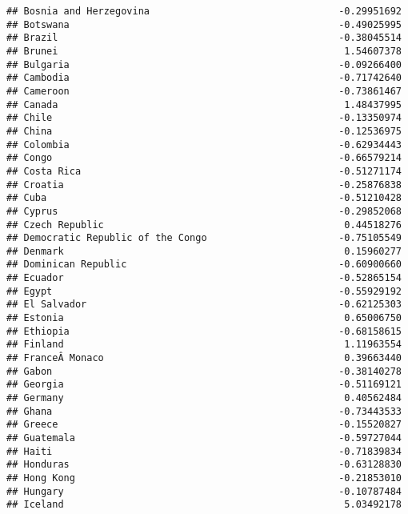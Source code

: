 \documentclass[
]{article}
\begin{document}
\begin{verbatim}
## Bosnia and Herzegovina                                 -0.29951692
## Botswana                                               -0.49025995
## Brazil                                                 -0.38045514
## Brunei                                                  1.54607378
## Bulgaria                                               -0.09266400
## Cambodia                                               -0.71742640
## Cameroon                                               -0.73861467
## Canada                                                  1.48437995
## Chile                                                  -0.13350974
## China                                                  -0.12536975
## Colombia                                               -0.62934443
## Congo                                                  -0.66579214
## Costa Rica                                             -0.51271174
## Croatia                                                -0.25876838
## Cuba                                                   -0.51210428
## Cyprus                                                 -0.29852068
## Czech Republic                                          0.44518276
## Democratic Republic of the Congo                       -0.75105549
## Denmark                                                 0.15960277
## Dominican Republic                                     -0.60900660
## Ecuador                                                -0.52865154
## Egypt                                                  -0.55929192
## El Salvador                                            -0.62125303
## Estonia                                                 0.65006750
## Ethiopia                                               -0.68158615
## Finland                                                 1.11963554
## FranceÂ Monaco                                          0.39663440
## Gabon                                                  -0.38140278
## Georgia                                                -0.51169121
## Germany                                                 0.40562484
## Ghana                                                  -0.73443533
## Greece                                                 -0.15520827
## Guatemala                                              -0.59727044
## Haiti                                                  -0.71839834
## Honduras                                               -0.63128830
## Hong Kong                                              -0.21853010
## Hungary                                                -0.10787484
## Iceland                                                 5.03492178

\end{verbatim}
\end{document}
